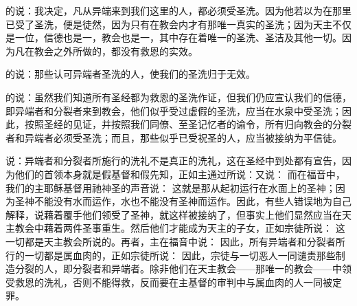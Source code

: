 的说：我决定，凡从异端来到我们这里的人，都必须受圣洗。因为他若以为在那里已受了圣洗，便是徒然，因为只有在教会内才有那唯一真实的圣洗；因为天主不仅是一位，信德也是一，教会也是一，其中存在着唯一的圣洗、圣洁及其他一切。因为凡在教会之外所做的，都没有救恩的实效。\par

的说：那些认可异端者圣洗的人，使我们的圣洗归于无效。\par

的说：虽然我们知道所有圣经都为救恩的圣洗作证，但我们仍应宣认我们的信德，即异端者和分裂者来到教会，他们似乎受过虚假的圣洗，应当在水泉中受圣洗；因此，按照圣经的见证，并按照我们同僚、至圣记忆者的谕令，所有归向教会的分裂者和异端者必须受圣洗；而且，那些似乎已受祝圣的人，应当被接纳为平信徒。\par

说：异端者和分裂者所施行的洗礼不是真正的洗礼，这在圣经中到处都有宣告，因为他们的首领本身就是假基督和假先知，正如主通过所说：又说：  而在福音中，我们的主耶稣基督用祂神圣的声音说：  这就是那从起初运行在水面上的圣神；因为圣神不能没有水而运作，水也不能没有圣神而运作。因此，有些人错误地为自己解释，说藉着覆手他们领受了圣神，就这样被接纳了，但事实上他们显然应当在天主教会中藉着两件圣事重生。然后他们才能成为天主的子女，正如宗徒所说：  这一切都是天主教会所说的。再者，主在福音中说：  因此，所有异端者和分裂者所行的一切都是属血肉的，正如宗徒所说：  因此，宗徒与一切恶人一同谴责那些制造分裂的人，即分裂者和异端者。除非他们在天主教会——那唯一的教会——中领受救恩的洗礼，否则不能得救，反而要在主基督的审判中与属血肉的人一同被定罪。\par

